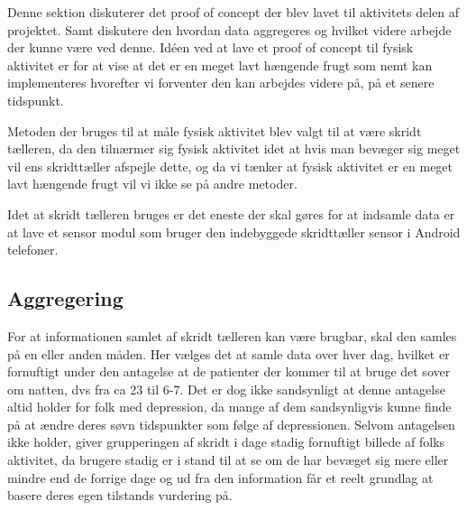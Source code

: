 Denne sektion diskuterer det proof of concept der blev lavet til aktivitets delen af projektet. Samt diskutere den hvordan data aggregeres og hvilket videre arbejde der kunne være ved denne. 
Idéen ved at lave et proof of concept til fysisk aktivitet er for at vise at det er en meget lavt hængende frugt som nemt kan implementeres hvorefter vi forventer den kan arbejdes videre på, på et senere tidspunkt.

Metoden der bruges til at måle fysisk aktivitet blev valgt til at være skridt tælleren, da den tilnærmer sig fysisk aktivitet idet at hvis man bevæger sig meget vil ens skridttæller afspejle dette, og da vi tænker at fysisk aktivitet er en meget lavt hængende frugt vil vi ikke se på andre metoder.

Idet at skridt tælleren bruges er det eneste der skal gøres for at indsamle data er at lave et sensor modul som bruger den indebyggede skridttæller sensor i Android telefoner. 

\subsection{Aggregering}
For at informationen samlet af skridt tælleren kan være brugbar, skal den samles på en eller anden måden.
Her vælges det at samle data over hver dag, hvilket er fornuftigt under den antagelse at de patienter der kommer til at bruge det sover om natten, dvs fra ca 23 til 6-7.
Det er dog ikke sandsynligt at denne antagelse altid holder for folk med depression, da mange af dem sandsynligvis kunne finde på at ændre deres søvn tidspunkter som følge af depressionen.
Selvom antagelsen ikke holder, giver grupperingen af skridt i dage stadig fornuftigt billede af folks aktivitet, da brugere stadig er i stand til at se om de har bevæget sig mere eller mindre end de forrige dage og ud fra den information får et reelt grundlag at basere deres egen tilstands vurdering på.